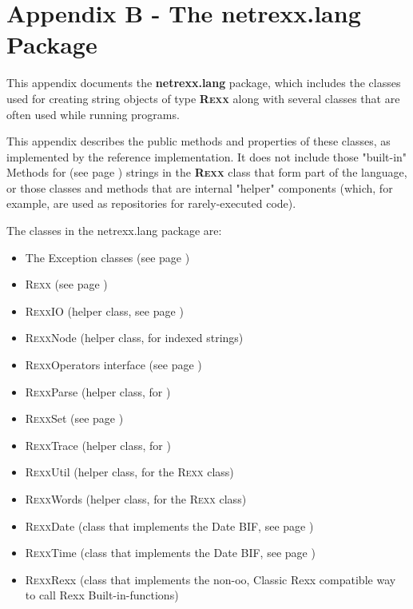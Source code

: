 \chapter{Appendix B - The netrexx.lang Package}\label{refappc}
 
This appendix documents the \textbf{netrexx.lang}
package, which includes the classes used for creating string objects of
type \textbf{R\textsc{exx}} along with several classes that are often used
while running \nr{} programs.
 
This appendix describes the public methods and properties of these
classes, as implemented by the reference implementation.  It does not
include those "built-in"  Methods for \nr{} (see page \pageref{refbmeth}) 
strings in the \textbf{R\textsc{exx}} class that form part of the
\nr{} language, or those classes and methods that are internal
"helper" components (which, for example, are used as
repositories for rarely-executed code).
 
The classes in the netrexx.lang package are:
\begin{itemize}
\item The  Exception classes (see page \pageref{refnlexcep}) 
\item  R\textsc{exx} (see page \pageref{refnlrexx}) 
\item R\textsc{exx}IO (helper class, see page \pageref{refrexxio})
\item R\textsc{exx}Node (helper class, for indexed strings)
\item  R\textsc{exx}Operators interface (see page \pageref{refnlrops}) 
\item R\textsc{exx}Parse (helper class, for )
\item  R\textsc{exx}Set (see page \pageref{refnlrset}) 
\item R\textsc{exx}Trace (helper class, for )
\item R\textsc{exx}Util (helper class, for the R\textsc{exx} class)
\item R\textsc{exx}Words (helper class, for the R\textsc{exx} class)
\item R\textsc{exx}Date (class that implements the Date BIF, see page
  \pageref{refrexxdate})
\item R\textsc{exx}Time (class that implements the Date BIF, see page
  \pageref{refrexxtime})
\item R\textsc{exx}Rexx (class that implements the non-oo, Classic
  Rexx compatible way to call
  Rexx Built-in-functions)
\end{itemize}
